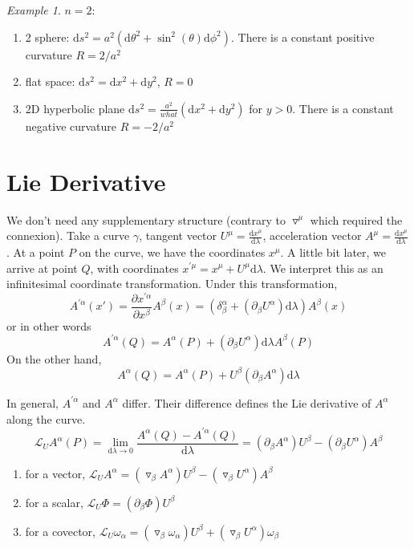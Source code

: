 \documentclass[a4paper]{book}
\theoremstyle{definition}
\theoremstyle{remark}
\newtheorem*{example}{Example}
\begin{document}
\begin{example}
    $n = 2$:
    \begin{enumerate}
        \item 2 sphere: $\text{d}s^2 = a^2(\text{d}\theta^2 + \sin^2(\theta) \text{d}\phi^2)$. There is a constant positive curvature $R = 2/a^2$
        \item flat space: $\text{d}s^2 = \text{d}x^2 + \text{d}y^2$, $R = 0$
        \item 2D hyperbolic plane $\text{d}s^2 = \frac{a^2}{what}(\text{d}x^2 + \text{d}y^2)$ for $y>0$. There is a constant negative curvature $R = -2/a^2$
    \end{enumerate}
\end{example}

\section{Lie Derivative}
We don't need any supplementary structure (contrary to $\triangledown^\mu$ which required the connexion). Take a curve $\gamma$, tangent vector $U^\mu = \frac{\text{d}x^\mu}{\text{d}\lambda}$, acceleration vector $A^\mu = \frac{\text{d}x^\mu}{\text{d}\lambda}$. At a point $P$ on the curve, we have the coordinates $x^\mu$. A little bit later, we arrive at point $Q$, with coordinates $x^{'\mu} = x^\mu + U^\mu \text{d}\lambda$. We interpret this as an infinitesimal coordinate transformation. Under this transformation, 
\begin{equation}
    A^{'\alpha}(x') = \frac{\partial x^{'\alpha}}{\partial x^\beta} A^\beta (x) = (\delta^\alpha_\beta + (\partial_\beta U^\alpha)\text{d}\lambda) A^\beta(x)
\end{equation}
or in other words
\begin{equation}
    A^{'\alpha}(Q) = A^{\alpha}(P) + (\partial_\beta U^\alpha)\text{d}\lambda A^\beta(P)
\end{equation}
On the other hand, 
\begin{equation}
    A^\alpha(Q) = A^\alpha(P) + U^\beta (\partial_\beta A^\alpha)\text{d}\lambda
\end{equation}

In general, $A^{'\alpha}$ and $A^{\alpha}$ differ. Their difference defines the Lie derivative of $A^\alpha$ along the curve. 
\begin{equation}
    \mathcal{L}_U A^\alpha (P) = \lim_{\text{d}\lambda \rightarrow 0} \frac{A^\alpha(Q) - A^{'\alpha}(Q)}{\text{d}\lambda} = (\partial_\beta A^\alpha)U^\beta - (\partial_\beta U^\alpha) A^\beta
\end{equation}
\begin{enumerate}
    \item for a vector, $\mathcal{L}_U A^\alpha = (\triangledown _\beta A^\alpha)U^\beta - (\triangledown_\beta U^{\alpha})A^{\beta}$
    \item for a scalar, $\mathcal{L}_U\Phi = (\partial_\beta \Phi)U^\beta$
    \item for a covector, $\mathcal{L}_U \omega_\alpha = (\triangledown _\beta \omega_\alpha)U^\beta + (\triangledown_\beta U^{\alpha})\omega_{\beta}$
\end{enumerate}
\end{document}
